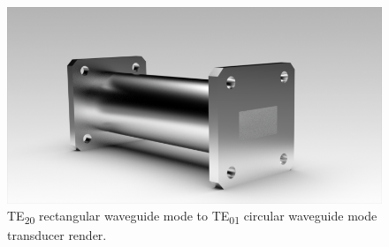 \documentclass[english,twoside]{article}
\begin{document}
	\begin{figure}[H]
		\centering
		\includegraphics[width=.7\textwidth]{renders/wrTE20ToWcTE01-2}
		\caption{TE\textsubscript{20} rectangular waveguide mode to TE\textsubscript{01} circular waveguide mode transducer render.}
	\end{figure}
    
    \newpage
\end{document}
